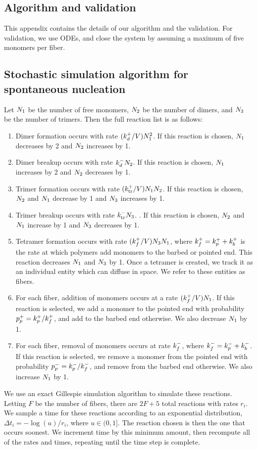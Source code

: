 \documentclass[11pt]{article}
\begin{document}
\begin{appendices}

\section{Algorithm and validation}
This appendix contains the details of our algorithm and the validation. For validation, we use ODEs, and close the system by assuming a maximum of five monomers per fiber.

\subsection{Stochastic simulation algorithm for spontaneous nucleation \label{sec:SSA}}
Let $N_1$ be the number of free monomers, $N_2$ be the number of dimers, and $N_3$ be the number of trimers. Then the full reaction list is as follows:
\begin{enumerate}
\item Dimer formation occurs with rate $(k_d^+/V)N_1^2$. If this reaction is chosen, $N_1$ decreases by 2 and $N_2$ increases by 1. 
\item Dimer breakup occurs with rate $k_d^- N_2$. If this reaction is chosen, $N_1$ increases by 2 and $N_2$ decreases by 1. 
\item Trimer formation occurs with rate $(k_\text{tr}^+/V)N_1 N_2 $. If this reaction is chosen, $N_2$ and $N_1$ decrease by 1 and $N_3$ increases by 1. 
\item Trimer breakup occurs with rate $k_\text{tr}^- N_3$. . If this reaction is chosen, $N_2$ and $N_1$ increase by 1 and $N_3$ decreases by 1. 
\item Tetramer formation occurs with rate $(k_f^+/V) N_3 N_1$, where $k_f^+=k_p^++k_b^+$ is the rate at which polymers add monomers to the barbed or pointed end. This reaction decreases $N_1$ and $N_3$ by 1. Once a tetramer is created, we track it as an individual entity which can diffuse in space. We refer to these entities as fibers. 
\item For each fiber, addition of monomers occurs at a rate $(k_f^+/V) N_1$. If this reaction is selected, we add a monomer to the pointed end with probability $p_p^+= k_p^+/k_f^+$, and add to the barbed end otherwise. We also decrease $N_1$ by 1. 
\item For each fiber, removal of monomers occurs at rate $k_f^-$, where $k_f^-=k_p^-+k_b^-$.  If this reaction is selected, we remove a monomer from the pointed end with probability $p_p^-=k_p^-/k_f^-$, and remove from the barbed end otherwise. We also increase $N_1$ by 1. 
\end{enumerate}
We use an exact Gillespie simulation algorithm \cite{gillespie2007stochastic} to simulate these reactions. Letting $F$ be the number of fibers, there are $2F+5$ total reactions with rates $r_i$. We sample a time for these reactions according to an exponential distribution, $\Delta t_i=-\log(u)/r_i$, where $u \in (0,1]$. The reaction chosen is then the one that occurs soonest. We increment time by this minimum amount, then recompute all of the rates and times, repeating until the time step is complete.


\end{appendices}
\end{document}
